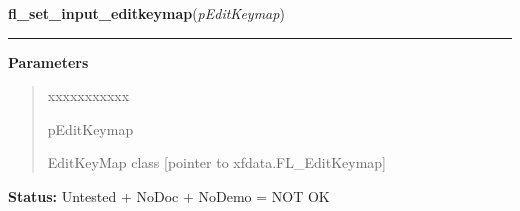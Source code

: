 \hspace{.8\funcindent}\begin{boxedminipage}{\funcwidth}

    \raggedright \textbf{fl\_set\_input\_editkeymap}(\textit{pEditKeymap})

    \vspace{-1.5ex}

    \rule{\textwidth}{0.5\fboxrule}
\setlength{\parskip}{2ex}
\setlength{\parskip}{1ex}
      \textbf{Parameters}
      \vspace{-1ex}

      \begin{quote}
        \begin{Ventry}{xxxxxxxxxxx}

          \item[pEditKeymap]

          EditKeyMap class [pointer to xfdata.FL\_EditKeymap]

        \end{Ventry}

      \end{quote}

\textbf{Status:} Untested + NoDoc + NoDemo = NOT OK



    \end{boxedminipage}

    \label{xformslib:library:fl_add_nmenu}

    \vspace{0.5ex}

